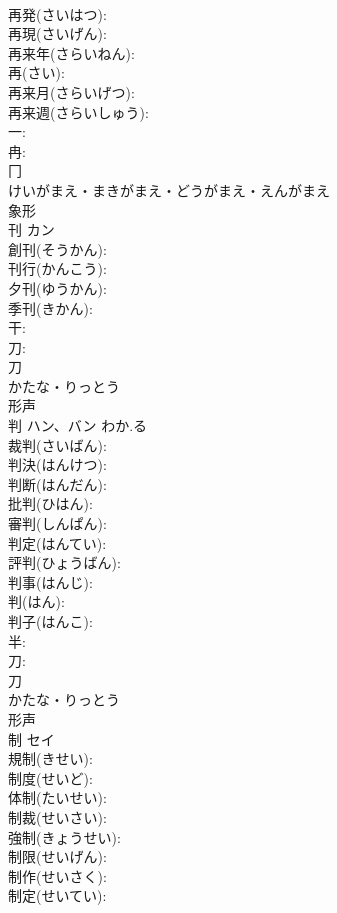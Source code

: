 \documentclass[8pt]{extreport}
\begin{document}
\begin{CJK}{UTF8}{min}
\\	再発(さいはつ): 
\\	再現(さいげん): 
\\	再来年(さらいねん): 
\\	再(さい): 
\\	再来月(さらいげつ): 
\\	再来週(さらいしゅう): 
\\	一: 
\\	冉: 
\\	冂	
\\	けいがまえ・まきがまえ・どうがまえ・えんがまえ	
\\	象形 
\\	刊	カン			
\\	創刊(そうかん): 
\\	刊行(かんこう): 
\\	夕刊(ゆうかん): 
\\	季刊(きかん): 
\\	干: 
\\	刀: 
\\	刀	
\\	かたな・りっとう	
\\	形声 
\\	判	ハン、バン	わか.る		
\\	裁判(さいばん): 
\\	判決(はんけつ): 
\\	判断(はんだん): 
\\	批判(ひはん): 
\\	審判(しんぱん): 
\\	判定(はんてい): 
\\	評判(ひょうばん): 
\\	判事(はんじ): 
\\	判(はん): 
\\	判子(はんこ): 
\\	半: 
\\	刀: 
\\	刀	
\\	かたな・りっとう	
\\	形声 
\\	制	セイ			
\\	規制(きせい): 
\\	制度(せいど): 
\\	体制(たいせい): 
\\	制裁(せいさい): 
\\	強制(きょうせい): 
\\	制限(せいげん): 
\\	制作(せいさく): 
\\	制定(せいてい): 

\end{CJK}
\end{document}
